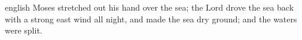 \documentclass{beamer}
\begin{document}
\begin{mekor}
\begin{mekorlang}{english}
\pasuk[14:21]  Moses stretched out his hand over the sea;  the Lord drove the sea back with a strong east wind all night, \mekorbreak and made the sea dry ground;  and the waters were split.
\end{mekorlang}
\end{mekor}
\end{document}
